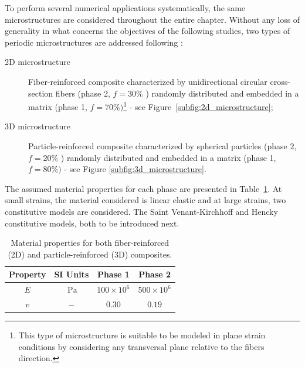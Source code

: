 To perform several numerical applications systematically, the same microstructures are considered throughout the entire chapter.
Without any loss of generality in what concerns the objectives of the following studies, two types of periodic microstructures are addressed following \cite{ferreira_accurate_2020}:

\begin{description}
  \item[2D microstructure] Fiber-reinforced composite characterized by unidirectional circular cross-section fibers (phase 2, \(f=30 \%\) ) randomly distributed and embedded in a matrix (phase 1, \(f=70 \%)\)\footnote{This type of microstructure is suitable to be modeled in plane strain conditions by considering any transversal plane
relative to the fibers direction.} - see Figure~\ref{subfig:2d_microstructure};

  \item[3D microstructure] Particle-reinforced composite characterized by spherical particles (phase 2, \(f=20 \%\) ) randomly distributed and embedded in a matrix (phase 1, \(f=80 \%)\) - see Figure \ref{subfig:3d_microstructure}.
\end{description}

The assumed material properties for each phase are presented in Table~\ref{tab:mat_properties}.
At small strains, the material considered is linear elastic and at large strains, two constitutive models are considered.
The Saint Venant-Kirchhoff and Hencky constitutive models, both to be introduced next.

\begin{table}[htbp]
  \caption{Material properties for both fiber-reinforced (2D) and particle-reinforced (3D) composites.}
\label{tab:mat_properties}
  \centering
  \begin{tabular}{cccc}
  \vphantom{\Big |}Property & SI Units & Phase 1 & Phase 2 \\
  \hline\hline \vphantom{\Big |}\(E\) & \(\mathrm{~Pa}\) & \(100 \times 10^{6}\) & \(500 \times 10^{6}\) \\
  \(v\) & \(-\) & \(0.30\) & \(0.19\) \\
  \hline\hline
  \end{tabular}
\end{table}

